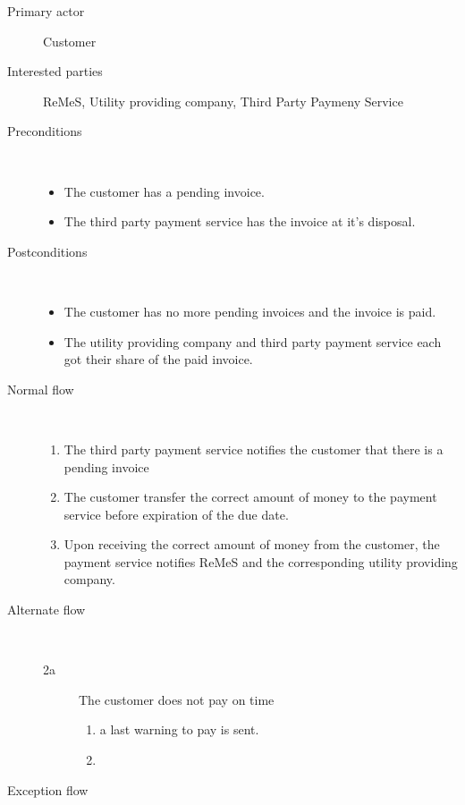 \begin{description}
	\item[Primary actor] Customer
	\item[Interested parties] ReMeS, Utility providing company, Third Party Paymeny
	Service
	\item[Preconditions] \ 
	\begin{itemize}
		\item The customer has a pending invoice.
		\item The third party payment service has the invoice at it's disposal.
	\end{itemize}
	\item[Postconditions] \ 
	\begin{itemize}
		\item The customer has no more pending invoices and the invoice is paid.
		\item The utility providing company and third party payment service each got
		their share of the paid invoice.
	\end{itemize}
	\item[Normal flow] \ 
	\begin{enumerate}
	  	\item The third party payment service notifies the customer that there is a
	  	pending invoice
	  	\item The customer transfer the correct amount of money to the payment
	  	service before expiration of the due date.
	  	\item Upon receiving the correct amount of money from the customer, the
	  	payment service notifies ReMeS and the corresponding utility providing
	  	company.
	\end{enumerate}
	\item[Alternate flow] \ 
	\begin{description}
		\item[2a] The customer does not pay on time
		\begin{enumerate}
		  \item a last warning to pay is sent.
		  \item 
		\end{enumerate}
	\end{description}
	\item[Exception flow] \ 
	\begin{description}
		\item 
	\end{description}
\end{description}
